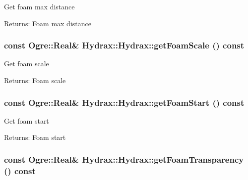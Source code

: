 Get foam max distance \begin{Desc}
\item[Returns:]Foam max distance \end{Desc}
\hypertarget{class_hydrax_1_1_hydrax_23f873e4659628d36274dfce9a76bc5c}{
\subsubsection[{getFoamScale}]{\setlength{\rightskip}{0pt plus 5cm}const Ogre::Real\& Hydrax::Hydrax::getFoamScale () const}}
\label{class_hydrax_1_1_hydrax_23f873e4659628d36274dfce9a76bc5c}


Get foam scale \begin{Desc}
\item[Returns:]Foam scale \end{Desc}
\hypertarget{class_hydrax_1_1_hydrax_a89f420e1adfd5bf578ba12fa0a3104e}{
\subsubsection[{getFoamStart}]{\setlength{\rightskip}{0pt plus 5cm}const Ogre::Real\& Hydrax::Hydrax::getFoamStart () const}}
\label{class_hydrax_1_1_hydrax_a89f420e1adfd5bf578ba12fa0a3104e}


Get foam start \begin{Desc}
\item[Returns:]Foam start \end{Desc}
\hypertarget{class_hydrax_1_1_hydrax_aa96bcad2550ec7eb1430a6af5a237d3}{
\subsubsection[{getFoamTransparency}]{\setlength{\rightskip}{0pt plus 5cm}const Ogre::Real\& Hydrax::Hydrax::getFoamTransparency () const}}
\label{class_hydrax_1_1_hydrax_aa96bcad2550ec7eb1430a6af5a237d3}


